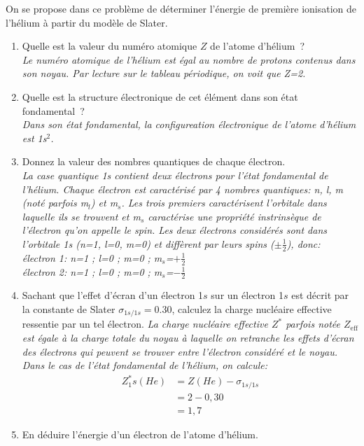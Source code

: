 
On se propose dans ce probl\`eme de d\'eterminer l'\'energie de premi\`ere ionisation de l'h\'elium \`a partir du mod\`ele de Slater.
\begin{enumerate}[\bf 1)]
\item Quelle est la valeur du num\'ero atomique $Z$ de l'atome d'h\'elium~?\\
\textsl{Le numéro atomique de l'hélium est égal au nombre de protons contenus dans son noyau.
Par lecture sur le tableau périodique, on voit que Z=2. }
\item Quelle est la structure \'electronique de cet \'el\'ement dans son \'etat fondamental~?\\
\textsl{Dans son état fondamental, la configureation électronique de l'atome d'hélium
est 1s$^2$.}
\item Donnez la valeur des nombres quantiques de chaque \'electron.\\
\textsl{La case quantique 1s contient deux électrons pour l'état fondamental de l'hélium.
Chaque électron est caractérisé par 4 nombres quantiques: n, l, m (noté parfois m$_l$)
et m$_s$.
Les trois premiers caractérisent l'orbitale
dans laquelle ils se trouvent et m$_s$ caractérise une propriété instrinsèque de l'électron
qu'on appelle le spin.
Les deux électrons considérés sont dans l'orbitale 1s (n=1, l=0, m=0) et diffèrent
par leurs spins ($\pm\frac{1}{2}$), donc:\\
électron 1: n=1 ; l=0 ; m=0 ; m$_s$=$+\frac{1}{2}$\\
électron 2: n=1 ; l=0 ; m=0 ; m$_s$=$-\frac{1}{2}$}
\item Sachant que l'effet d'\'ecran d'un \'electron 1$s$ sur un \'electron 1$s$ est d\'ecrit par la constante de Slater $\sigma_{1s/1s}=0.30$, calculez la charge nucl\'eaire effective ressentie par un tel \'electron. 
\textsl{%
La charge nucléaire effective $Z^*$ parfois notée $Z_\text{eff}$ est égale à la charge totale du noyau à laquelle on retranche les effets
d'écran des électrons qui peuvent se trouver entre l'électron considéré et le noyau.
Dans le cas de l'état fondamental de l'hélium, on calcule:
\begin{align*}
Z^*_1s(He) &= Z(He) - \sigma_{1s/1s}\\
           &= 2 - 0,30          \\
           &= 1,7
\end{align*}
}
\item En d\'eduire l'\'energie d'un \'electron de l'atome d'h\'elium.

\end{enumerate}
